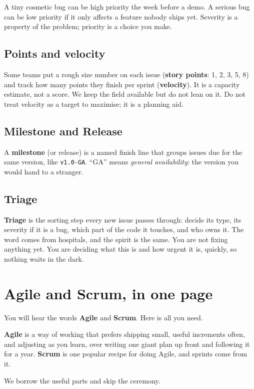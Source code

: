 \documentclass[11pt,a4paper]{report}
\newcommand{\code}[1]{\texttt{#1}}
\begin{document}
A tiny cosmetic bug can be high priority the week before a demo. A serious bug can
be low priority if it only affects a feature nobody ships yet. Severity is a
property of the problem; priority is a choice you make.

\section{Points and velocity}
Some teams put a rough size number on each issue (\textbf{story points}: 1, 2, 3,
5, 8) and track how many points they finish per sprint (\textbf{velocity}). It is a
capacity estimate, not a score. We keep the field available but do not lean on it.
Do not treat velocity as a target to maximise; it is a planning aid.

\section{Milestone and Release}
A \textbf{milestone} (or release) is a named finish line that groups issues due for
the same version, like \code{v1.0-GA}. ``GA'' means \emph{general availability}:
the version you would hand to a stranger.

\section{Triage}
\textbf{Triage} is the sorting step every new issue passes through: decide its
type, its severity if it is a bug, which part of the code it touches, and who owns
it. The word comes from hospitals, and the spirit is the same. You are not fixing
anything yet. You are deciding what this is and how urgent it is, quickly, so
nothing waits in the dark.

\chapter{Agile and Scrum, in one page}

You will hear the words \textbf{Agile} and \textbf{Scrum}. Here is all you need.

\textbf{Agile} is a way of working that prefers shipping small, useful increments
often, and adjusting as you learn, over writing one giant plan up front and
following it for a year. \textbf{Scrum} is one popular recipe for doing Agile, and
sprints come from it.

We borrow the useful parts and skip the ceremony.
\end{document}
